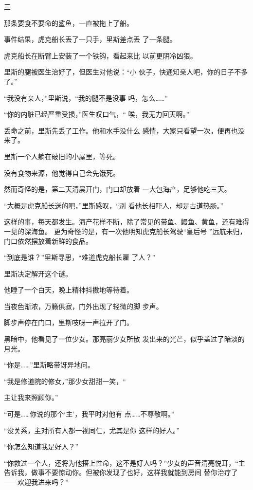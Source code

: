 \documentclass{article}
\begin{document}
三 


那条要食不要命的鲨鱼，一直被拖上了船。 

事件结果，虎克船长丢了一只手，里斯差点丢
了一条腿。 

虎克船长在断臂上安装了一个铁钩，看起来比
以前更阴冷凶狠。 

里斯的腿被医生治好了，但医生对他说：“小
伙子，快通知亲人吧，你的日子不多了。” 

\newpage

“我没有亲人，”里斯说，“我的腿不是没事
吗，怎么……” 

“你的内脏已经严重受损，”医生叹口气，“
唉，我无力回天啊。” 

丢命之前，里斯先丢了工作。他和水手没什么
感情，大家只看望一次，便再也没来了。 


里斯一个人躺在破旧的小屋里，等死。 


没有食物来源，他觉得自己会先饿死。 

然而奇怪的是，第二天清晨开门，门口却放着
一大包海产，足够他吃三天。 

“大概是虎克船长送的吧，”里斯感叹，“别
看他长相吓人，却是古道热肠。” 

这样的事，每天都发生。海产花样不断，除了常见的带鱼、鳗鱼、黄鱼，还有难得一见的深海鱼。
\newpage
更为奇怪的是，有一次他明知虎克船长驾驶“皇后号
”远航未归，门口依然摆放着新鲜的食品。 

“到底是谁？”里斯寻思，“难道虎克船长雇
了人？” 


里斯决定解开这个谜。 


他睡了一个白天，晚上精神抖擞地等待着。 

当夜色渐浓，万籁俱寂，门外出现了轻微的脚
步声。 


脚步声停在门口，里斯吱呀一声拉开了门。 

黑暗中，他看见了一位少女。那亮丽少女所散
发出来的光芒，似乎盖过了暗淡的月光。 


“你是……”里斯略带讶异地问。 

“我是修道院的修女，”那少女甜甜一笑，“
\newpage

主让我来照顾你。” 

“可是……你说的那个‘主’，我平时对他有
点……不尊敬啊。” 

“没关系，主对所有人都一视同仁，尤其是你
这样的好人。” 


“你怎么知道我是好人？” 

“你救过一个人，还将为他搭上性命，这不是好人吗？”少女的声音清亮悦耳，“主告诉我，做事不要惊动你。但被你发现了也好，这样我就能到房间
替你治疗了——欢迎我进来吗？” 
\end{document}
